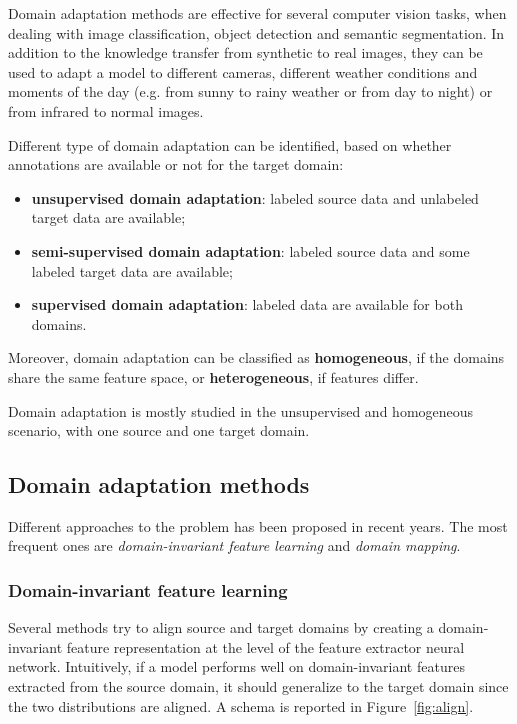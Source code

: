 \documentclass[%
    corpo=12pt,
    twoside,
    stile=classica,   
    tipotesi=magistrale,
    evenboxes,
    english
]{toptesi}
\begin{document}
Domain adaptation methods are effective for several computer vision tasks, when dealing with image classification, object detection and semantic segmentation. In addition to the knowledge transfer from synthetic to real images, they can be used to adapt a model to different cameras, different weather conditions and moments of the day (e.g. from sunny to rainy weather or from day to night) or from infrared to normal images.

Different type of domain adaptation can be identified, based on whether an\-no\-ta\-tions are available or not for the target domain:

\begin{itemize}
	\item \textbf{unsupervised domain adaptation}: labeled source data and unlabeled target data are available;
	\item \textbf{semi-supervised domain adaptation}: labeled source data and some labeled target data are available;
	\item \textbf{supervised domain adaptation}: labeled data are available for both domains.
\end{itemize}
Moreover, domain adaptation can be classified as \textbf{homogeneous}, if the domains share the same feature space, or \textbf{heterogeneous}, if features differ.

Domain adaptation is mostly studied in the unsupervised and homogeneous scenario, with one source and one target domain.

\subsection{Domain adaptation methods}
Different approaches to the problem has been proposed in recent years. The most frequent ones are \textit{domain-invariant feature learning} and \textit{domain mapping}.

\subsubsection{Domain-invariant feature learning}
Several methods try to align source and target domains by creating a domain-invariant feature representation at the level of the feature extractor neural network. Intuitively, if a model performs well on domain-invariant features extracted from the source domain, it should generalize to the target domain since the two distributions are aligned. A schema is reported in Figure~\ref{fig:align}.
\end{document}
